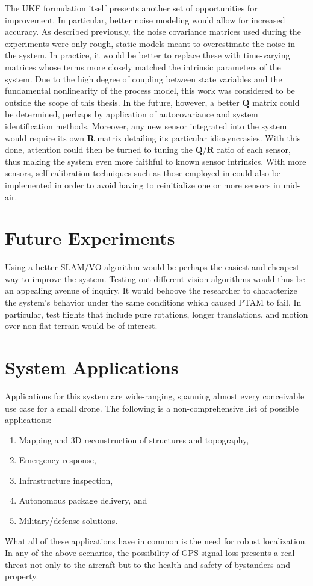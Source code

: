 The UKF formulation itself presents another set of opportunities for improvement. In particular, better noise modeling would allow for increased accuracy. As described previously, the noise covariance matrices used during the experiments were only rough, static models meant to overestimate the noise in the system. In practice, it would be better to replace these with time-varying matrices whose terms more closely matched the intrinsic parameters of the system. Due to the high degree of coupling between state variables and the fundamental nonlinearity of the process model, this work was considered to be outside the scope of this thesis. In the future, however, a better $\mathbf{Q}$ matrix could be determined, perhaps by application of autocovariance and system identification methods. Moreover, any new sensor integrated into the system would require its own $\mathbf{R}$ matrix detailing its particular idiosyncrasies. With this done, attention could then be turned to tuning the $\mathbf{Q} / \mathbf{R}$ ratio of each sensor, thus making the system even more faithful to known sensor intrinsics. With more sensors, self-calibration techniques such as those employed in \cite{Weiss2012} could also be implemented in order to avoid having to reinitialize one or more sensors in mid-air.

\section{Future Experiments}

Using a better SLAM/VO algorithm would be perhaps the easiest and cheapest way to improve the system. Testing out different vision algorithms would thus be an appealing avenue of inquiry. It would behoove the researcher to characterize the system's behavior under the same conditions which caused PTAM to fail. In particular, test flights that include pure rotations, longer translations, and motion over non-flat terrain would be of interest.  

\section{System Applications}

Applications for this system are wide-ranging, spanning almost every conceivable use case for a small drone. The following is a non-comprehensive list of possible applications:
\begin{enumerate}
    \item Mapping and 3D reconstruction of structures and topography,
    \item Emergency response,
    \item Infrastructure inspection,
    \item Autonomous package delivery, and
    \item Military/defense solutions.
\end{enumerate}
What all of these applications have in common is the need for robust localization. In any of the above scenarios, the possibility of GPS signal loss presents a real threat not only to the aircraft but to the health and safety of bystanders and property.

